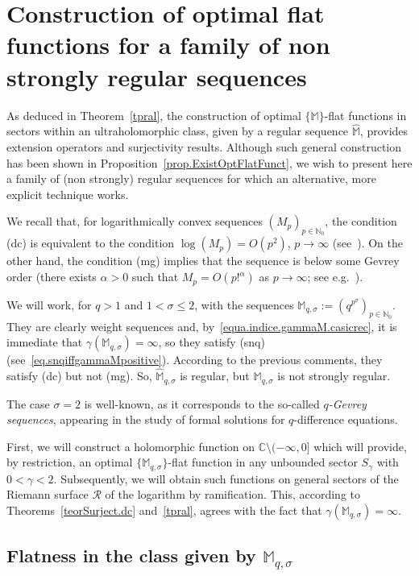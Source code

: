 \documentclass[11pt,a4paper]{article}
\theoremstyle{plain}
\theoremstyle{definition}
\newcommand{\N}{\mathbb{N}}
\newcommand{\C}{\mathbb{C}}
\newcommand{\M}{\mathbb{M}}
\newcommand{\hM}{\widehat{\M}}
\def\a{\alpha}
\def\ga{\gamma}
\def\Ms{{\mathbb{M}}_{q,\sigma}}
\begin{document}
\section{Construction of optimal flat functions for a family of non strongly regular sequences}\label{sectConstrOptFlatNon_SR_Seq}

As deduced in Theorem~\ref{tpral}, the construction of optimal $\{\M\}$-flat functions in sectors within an ultraholomorphic class, given by a regular sequence $\hM$, provides extension operators and surjectivity results.
Although such general construction has been shown in Proposition~\ref{prop.ExistOptFlatFunct}, we wish to present here a family of (non strongly) regular sequences for which an alternative, more explicit technique works.

We recall that, for logarithmically convex sequences $(M_p)_{p\in\N_0}$, the condition  (dc) is equivalent to the condition $\log(M_p)=O(p^2)$, $p\to\infty$ (see~\cite[Ch.~6]{Mandelbrojt}). On the other hand, the condition (mg) implies that the sequence is below some Gevrey order (there exists $\a>0$ such that $M_p=O(p!^{\a})$ as $p\to\infty$; see e.g.~\cite{Matsumoto84,Thilliez03}).

We will work, for $q>1$ and $1<\sigma\le 2$, with the sequences $\M_{q,\sigma}:=(q^{p^\sigma})_{p\in\N_0}$. They are clearly weight sequences and, by~\eqref{equa.indice.gammaM.casicrec}, it is immediate that $\ga(\M_{q,\sigma})=\infty$, so they satisfy (snq) (see~\eqref{eq.snqiffgammaMpositive}). According to the previous comments, they satisfy (dc) but not (mg). So, $\hM_{q,\sigma}$ is regular, but $\M_{q,\sigma}$ is not strongly regular.

The case $\sigma=2$ is well-known, as it corresponds
to the so-called \emph{$q$-Gevrey sequences}, appearing in the study of formal solutions for $q$-difference equations.

First, we will construct a holomorphic function on $\C\setminus(-\infty,0]$ which will provide, by restriction, an optimal $\{\M_{q,\sigma}\}$-flat function in any unbounded sector $S_{\ga}$ with $0<\ga<2$. Subsequently, we will obtain such functions on general sectors of the Riemann surface $\mathcal{R}$ of the logarithm by ramification. This, according to Theorems~\ref{teorSurject.dc} and~\ref{tpral}, agrees with the fact that $\ga(\M_{q,\sigma})=\infty$.


\subsection{Flatness in the class given by $\Ms$}
\end{document}
